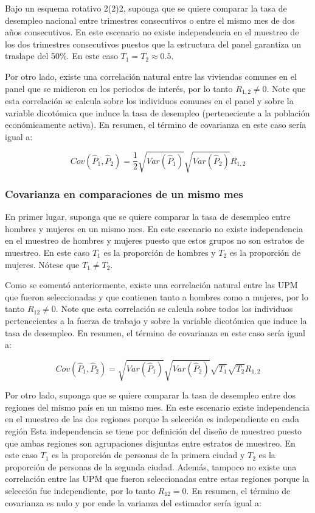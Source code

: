 \documentclass[
  12pt,
]{book}
\begin{document}
Bajo un esquema rotativo 2(2)2, suponga que se quiere comparar la tasa de desempleo nacional entre trimestres consecutivos o entre el mismo mes de dos años consecutivos. En este escenario no existe independencia en el muestreo de los dos trimestres consecutivos puestos que la estructura del panel garantiza un traslape del 50\%. En este caso \(T_1 = T_2 \approx 0.5\).

Por otro lado, existe una correlación natural entre las viviendas comunes en el panel que se midieron en los periodos de interés, por lo tanto \(R_{1,2} \neq 0\). Note que esta correlación se calcula sobre los individuos comunes en el panel y sobre la variable dicotómica que induce la tasa de desempleo (perteneciente a la población económicamente activa). En resumen, el término de covarianza en este caso sería igual a:

\[
Cov(\hat{P}_1, \hat{P}_2) = \frac{1}{2}\sqrt{Var(\hat{P}_1)}\sqrt{Var(\hat{P}_2)}R_{1,2}
\]

\hypertarget{covarianza-en-comparaciones-de-un-mismo-mes}{%
\subsubsection{Covarianza en comparaciones de un mismo mes}\label{covarianza-en-comparaciones-de-un-mismo-mes}}

En primer lugar, suponga que se quiere comparar la tasa de desempleo entre hombres y mujeres en un mismo mes. En este escenario no existe independencia en el muestreo de hombres y mujeres puesto que estos grupos no son estratos de muestreo. En este caso \(T_1\) es la proporción de hombres y \(T_2\) es la proporción de mujeres. Nótese que \(T_1 \neq T_2\).

Como se comentó anteriormente, existe una correlación natural entre las UPM que fueron seleccionadas y que contienen tanto a hombres como a mujeres, por lo tanto \(R_{12} \neq 0\). Note que esta correlación se calcula sobre todos los individuos pertenecientes a la fuerza de trabajo y sobre la variable dicotómica que induce la tasa de desempleo. En resumen, el término de covarianza en este caso sería igual a:

\[
Cov(\hat{P}_1, \hat{P}_2) = \sqrt{Var(\hat{P}_1)}\sqrt{Var(\hat{P}_2)}\sqrt{T_1}\sqrt{T_2}R_{1,2}
\]

Por otro lado, suponga que se quiere comparar la tasa de desempleo entre dos regiones del mismo país en un mismo mes. En este escenario existe independencia en el muestreo de las dos regiones porque la selección es independiente en cada región Esta independencia se tiene por definición del diseño de muestreo puesto que ambas regiones son agrupaciones disjuntas entre estratos de muestreo. En este caso \(T_1\) es la proporción de personas de la primera ciudad y \(T_2\) es la proporción de personas de la segunda ciudad. Además, tampoco no existe una correlación entre las UPM que fueron seleccionadas entre estas regiones porque la selección fue independiente, por lo tanto \(R_{12} = 0\). En resumen, el término de covarianza es nulo y por ende la varianza del estimador sería igual a:
\end{document}
